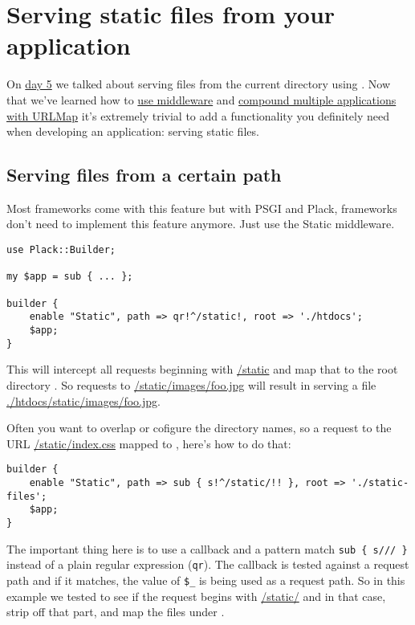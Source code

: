 \chapter{Serving static files from your
application}\label{day-17-serving-static-files-from-your-application}

On
\href{http://advent.plackperl.org/2009/12/day-5-run-a-static-file-web-server-with-plack.html}{day
5} we talked about serving files from the current directory using
. Now that we've learned how to
\href{http://advent.plackperl.org/2009/12/day-10-using-plack-middleware.html}{use
middleware} and
\href{http://advent.plackperl.org/2009/12/day-12-maps-multiple-apps-with-mount-and-urlmap.html}{compound
multiple applications with URLMap} it's extremely trivial to add a
functionality you definitely need when developing an application:
serving static files.

\section{Serving files from a certain
path}\label{serving-files-from-a-certain-path}

Most frameworks come with this feature but with PSGI and Plack,
frameworks don't need to implement this feature anymore. Just use the
Static middleware.

\begin{lstlisting}
use Plack::Builder;

my $app = sub { ... };

builder {
    enable "Static", path => qr!^/static!, root => './htdocs';
    $app;
}
\end{lstlisting}

This will intercept all requests beginning with \url{/static} and map that
to the root directory . So requests to
\url{/static/images/foo.jpg} will result in serving a file
\url{./htdocs/static/images/foo.jpg}.

Often you want to overlap or cofigure the directory names, so a request
to the URL \url{/static/index.css} mapped to ,
here's how to do that:

\begin{lstlisting}
builder {
    enable "Static", path => sub { s!^/static/!! }, root => './static-files';
    $app;
}
\end{lstlisting}

The important thing here is to use a callback and a pattern match
\lstinline!sub { s/// }! instead of a plain regular expression
(\lstinline!qr!). The callback is tested against a request path and if
it matches, the value of \lstinline!$_! is being used as a request path.
So in this example we tested to see if the request begins with
\url{/static/} and in that case, strip off that part, and map the files
under .

